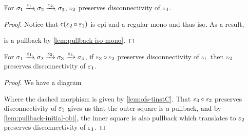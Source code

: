 \begin{lemma}\label{lem:dcon-pres-rmono}
    For $\sigma_1 \xrto{\me_1} \sigma_2 \xrto{\me_2} \sigma_3$, $\varepsilon_2$ preserves disconnectivity of $\varepsilon_1$.
\end{lemma}
\begin{proof}
    Notice that $\mathsf{c}(\varepsilon_2 \circ \varepsilon_1)$ is epi and a regular mono and thus iso.
    As a result,
    \begin{center}
    \end{center}
    is a pullback by \cref{lem:pullback-iso-mono}.
\end{proof}

\begin{lemma}\label{lem:dcon-pres-dclosed}
    For $\sigma_1 \xrto{\me_1} \sigma_2 \xto{\me_2} \sigma_3 \xto{\me_3} \sigma_4$, if $\varepsilon_3 \circ \varepsilon_2$ preserves disconnectivity of $\varepsilon_1$ then
    $\varepsilon_2$ preserves disconnectivity of $\varepsilon_1$.
\end{lemma}
\begin{proof}
    We have a diagram
    \begin{center}
    \end{center}
    Where the dashed morphism is given by \cref{lem:ofs-tinstC}.
    That $\varepsilon_3 \circ \varepsilon_2$ preserves disconnectivity of $\varepsilon_1$ gives us that the outer square is a pullback,
    and by \cref{lem:pullback-initial-obj}, the inner square is also pullback which translates to 
    $\varepsilon_2$ preserves disconnectivity of $\varepsilon_1$.
\end{proof}

